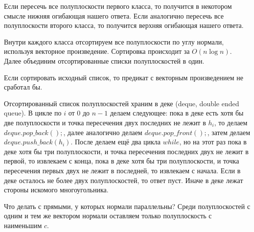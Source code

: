 Если пересечь все полуплоскости первого класса, то получится в некотором смысле нижняя огибающая нашего ответа. Если аналогично пересечь все полуплоскости второго класса, то получится верхняя огибающая нашего ответа.

Внутри каждого класса отсортируем все полуплоскости по углу нормали, используя векторное произведение. Сортировка происходит за $O (n \log n)$. Далее объединим отсортированные списки полуплоскостей в один.

\Note Если сортировать исходный список, то предикат с векторным произведением не сработал бы.

Отсортированный список полуплоскостей храним в деке (deque, double ended queue). В цикле по $i$ от $0$ до $n - 1$ делаем следующее: пока в деке есть хотя бы две полуплоскости и точка пересечения двух последних не лежит в $h_i$, то делаем $deque.pop\_back();$, далее аналогично делаем $deque.pop\_front();$, затем делаем $deque.push\_back(h_i)$. После делаем ещё два цикла $while$, но на этот раз пока в деке хотя бы три полуплоскости, и точка пересечения последних двух не лежит в первой, то извлекаем с конца, пока в деке хотя бы три полуплоскости, и точка пересечения первых двух не лежит в последней, то извлекаем с начала. Если в деке осталось не более двух полуплоскостей, то ответ пуст. Иначе в деке лежат стороны искомого многоугольника.

Что делать с прямыми, у которых нормали параллельны? Среди полуплоскостей с одним и тем же вектором нормали оставляем только полуплоскость с наименьшим $c$.

\newpage{}

